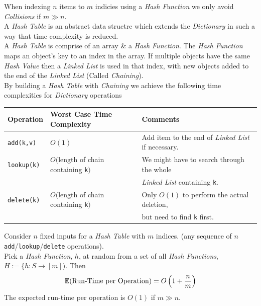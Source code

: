 \documentclass[11pt,a4paper]{article}
\begin{document}

When indexing $n$ items to $m$ indicies using a \textit{Hash Function} we only avoid \textit{Collisions} if $m\gg n$.\\

A \textit{Hash Table} is an abstract data structre which extends the \textit{Dictionary} in such a way that time complexity is reduced.\\
A \textit{Hash Table} is comprise of an array \& a \textit{Hash Function}. The \textit{Hash Function} maps an object's key to an index in the array. If multiple objects have the same \textit{Hash Value} then a \textit{Linked List} is used in that index, with new objects added to the end of the \textit{Linked List} (Called \textit{Chaining}).\\

By building a \textit{Hash Table} with \textit{Chaining} we achieve the following time complexities for \textit{Dictionary} operations
\begin{center}
\begin{tabular}{l|l|l}
\textbf{Operation}&\textbf{Worst Case Time Complexity}&Comments\\\hline
\lstinline!add(k,v)!&$O(1)$&Add item to the end of \textit{Linked List} if necessary.\\
\lstinline!lookup(k)!&$O($length of chain containing \lstinline!k!$)$&We might have to search through the whole\\&&\textit{Linked List} containing \lstinline!k!.\\
\lstinline!delete(k)!&$O($length of chain containing \lstinline!k!$)$&Only $O(1)$ to perform the actual deletion,\\
&&but need to find \lstinline!k! first.
\end{tabular}
\end{center}

Consider $n$ fixed inputs for a \textit{Hash Table} with $m$ indices. (\ie any sequence of $n$ \lstinline!add!/\lstinline!lookup!/\lstinline!delete! operations).\\
Pick a \textit{Hash Function}, $h$, at random from a set of all \textit{Hash Functions}, $H:=\{h:S\to[m])$. Then
$$\mathbb{E}(\text{Run-Time per Operation})=O\left(1+\frac{n}{m}\right)$$
\nb The expected run-time per operation is $O(1)$ if $m\gg n$.\\
\end{document}

